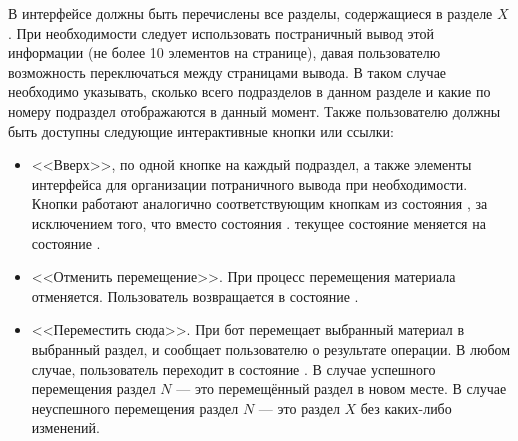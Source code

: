 \begin{enumerate}
            В интерфейсе должны быть перечислены все разделы, содержащиеся в разделе
            \(X\). При необходимости следует использовать постраничный вывод этой информации
            (не более 10 элементов на странице), давая пользователю возможность переключаться
            между страницами вывода. В таком случае необходимо указывать, сколько всего подразделов
            в данном разделе и какие по номеру подраздел отображаются в данный момент.
            Также пользователю должны быть доступны следующие интерактивные кнопки или ссылки:
            \begin{itemize}
                \item
                    <<Вверх>>, по одной кнопке на каждый подраздел, а также
                    элементы интерфейса для организации потраничного вывода при необходимости.
                    Кнопки работают аналогично соответствующим кнопкам из состояния 
                    \hyperref[itm:req:ui:states:navx]
                    {}, за исключением того,
                    что вместо состояния
                    \hyperref[itm:req:ui:states:navx]
                    {}.
                    текущее состояние меняется на состояние
                    \hyperref[itm:req:ui:states:move-kbo]
                    {}.
                \item
                    <<Отменить перемещение>>.
                    При  процесс перемещения материала отменяется.
                    Пользователь возвращается в состояние
                    \hyperref[itm:req:ui:states:navx]
                    {}.
                \item
                    <<Переместить сюда>>.
                    При  бот перемещает выбранный материал в выбранный раздел,
                    и сообщает пользователю о результате операции. В любом случае, пользователь
                    переходит в состояние
                    \hyperref[itm:req:ui:states:navx]
                    {}.
                    В случае успешного перемещения раздел \(N\) --- это перемещённый раздел
                    в новом месте. В случае неуспешного перемещения раздел \(N\) --- это раздел \(X\)
                    без каких-либо изменений.
            \end{itemize}


\end{enumerate}
